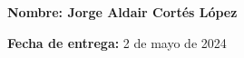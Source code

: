 \documentclass[a4paper,12pt]{article} %
\begin{document}




\vspace*{0.1 cm}

\textbf{Nombre: Jorge Aldair Cortés López}
\begin{flushright}
\textbf{Fecha de entrega: }2 de mayo de 2024\\
\end{flushright}
 

\vspace{0.3cm}




\end{document}
